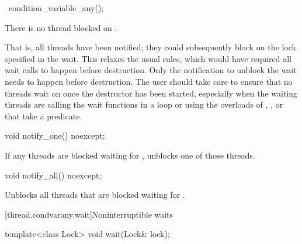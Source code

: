 %
\begin{itemdecl}
~condition_variable_any();
\end{itemdecl}

\begin{itemdescr}
\pnum
\expects
There is no thread blocked on .
\begin{note}
That is, all
threads have been notified; they could subsequently block on the lock specified in the
wait.
This relaxes the usual rules, which would have required all wait calls to happen before
destruction. Only the notification to unblock the wait needs to happen before destruction.
The user should take care to ensure that no threads wait on  once the destructor has
been started, especially when the waiting threads are calling the wait functions in a loop or
using the overloads of , , or  that take a predicate.
\end{note}
\end{itemdescr}

%
\begin{itemdecl}
void notify_one() noexcept;
\end{itemdecl}

\begin{itemdescr}
\pnum
\effects
If any threads are blocked waiting for , unblocks one of those threads.
\end{itemdescr}

%
\begin{itemdecl}
void notify_all() noexcept;
\end{itemdecl}

\begin{itemdescr}
\pnum
\effects
Unblocks all threads that are blocked waiting for .
\end{itemdescr}

[thread.condvarany.wait]{Noninterruptible waits}

%
\begin{itemdecl}
template<class Lock>
  void wait(Lock& lock);
\end{itemdecl}

